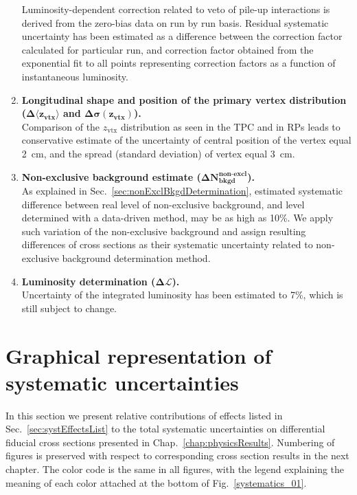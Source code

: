\begin{enumerate}
 Luminosity-dependent correction related to veto of pile-up interactions is derived from the zero-bias data on run by run basis. Residual systematic uncertainty has been estimated as a difference between the correction factor calculated for particular run, and correction factor obtained from the exponential fit to all points representing correction factors as a function of instantaneous luminosity.
 \item \textbf{Longitudinal shape and position of the primary vertex distribution ($\bm{\Delta\langle z_{\text{vtx}}\rangle}$ and $\bm{\Delta\sigma( z_{\text{vtx}})}$).}\\
 Comparison of the $z_{\text{vtx}}$ distribution as seen in the TPC and in RPs leads to conservative estimate of the uncertainty of central position of the vertex equal 2~cm, and the spread (standard deviation) of vertex equal 3~cm.
 \item \textbf{Non-exclusive background estimate ($\bm{\Delta N_{\text{bkgd}}^{\text{non-excl}}}$).}\\
 As explained in Sec.~\ref{sec:nonExclBkgdDetermination}, estimated systematic difference between real level of non-exclusive background, and level determined with a data-driven method, may be as high as 10\%. We apply such variation of the non-exclusive background and assign resulting differences of cross sections as their systematic uncertainty related to non-exclusive background determination method.
 \item \textbf{Luminosity determination ($\bm{\Delta\mathcal{L}}$).}\\
 Uncertainty of the integrated luminosity has been estimated to 7\%, which is still subject to change.
\end{enumerate}

\section{Graphical representation of systematic uncertainties}
In this section we present relative contributions of effects listed in Sec.~\ref{sec:systEffectsList} to the total systematic uncertainties on differential fiducial cross sections presented in Chap.~\ref{chap:physicsResults}. Numbering of figures is preserved with respect to corresponding cross section results in the next chapter. The color code is the same in all figures, with the legend explaining the meaning of each color attached at the bottom of Fig.~\ref{systematics_01}.



